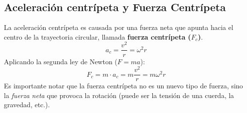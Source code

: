 \documentclass[11pt]{article}
\begin{document}
\subsection{Aceleración centrípeta y Fuerza Centrípeta}
La aceleración centrípeta es causada por una fuerza neta que apunta hacia el centro de la trayectoria circular, llamada \textbf{fuerza centrípeta ($F_c$)}.
\[ a_c = \frac{v^2}{r} = \omega^2 r \]
Aplicando la segunda ley de Newton ($F=ma$):
\[ F_c = m \cdot a_c = m \frac{v^2}{r} = m \omega^2 r \]
Es importante notar que la fuerza centrípeta no es un nuevo tipo de fuerza, sino la \textit{fuerza neta} que provoca la rotación (puede ser la tensión de una cuerda, la gravedad, etc.).
\end{document}
